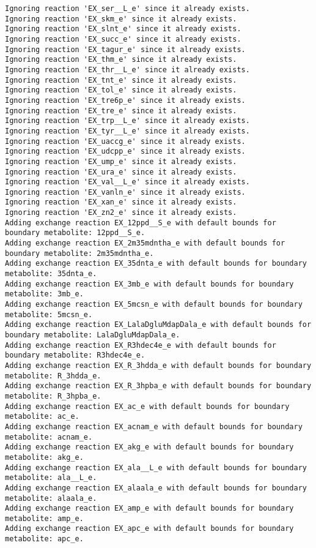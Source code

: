 \documentclass[
  letterpaper,
  DIV=11,
  numbers=noendperiod]{scrartcl}
\begin{document}
\begin{verbatim}
Ignoring reaction 'EX_ser__L_e' since it already exists.
Ignoring reaction 'EX_skm_e' since it already exists.
Ignoring reaction 'EX_slnt_e' since it already exists.
Ignoring reaction 'EX_succ_e' since it already exists.
Ignoring reaction 'EX_tagur_e' since it already exists.
Ignoring reaction 'EX_thm_e' since it already exists.
Ignoring reaction 'EX_thr__L_e' since it already exists.
Ignoring reaction 'EX_tnt_e' since it already exists.
Ignoring reaction 'EX_tol_e' since it already exists.
Ignoring reaction 'EX_tre6p_e' since it already exists.
Ignoring reaction 'EX_tre_e' since it already exists.
Ignoring reaction 'EX_trp__L_e' since it already exists.
Ignoring reaction 'EX_tyr__L_e' since it already exists.
Ignoring reaction 'EX_uaccg_e' since it already exists.
Ignoring reaction 'EX_udcpp_e' since it already exists.
Ignoring reaction 'EX_ump_e' since it already exists.
Ignoring reaction 'EX_ura_e' since it already exists.
Ignoring reaction 'EX_val__L_e' since it already exists.
Ignoring reaction 'EX_vanln_e' since it already exists.
Ignoring reaction 'EX_xan_e' since it already exists.
Ignoring reaction 'EX_zn2_e' since it already exists.
Adding exchange reaction EX_12ppd__S_e with default bounds for boundary metabolite: 12ppd__S_e.
Adding exchange reaction EX_2m35mdntha_e with default bounds for boundary metabolite: 2m35mdntha_e.
Adding exchange reaction EX_35dnta_e with default bounds for boundary metabolite: 35dnta_e.
Adding exchange reaction EX_3mb_e with default bounds for boundary metabolite: 3mb_e.
Adding exchange reaction EX_5mcsn_e with default bounds for boundary metabolite: 5mcsn_e.
Adding exchange reaction EX_LalaDgluMdapDala_e with default bounds for boundary metabolite: LalaDgluMdapDala_e.
Adding exchange reaction EX_R3hdec4e_e with default bounds for boundary metabolite: R3hdec4e_e.
Adding exchange reaction EX_R_3hdda_e with default bounds for boundary metabolite: R_3hdda_e.
Adding exchange reaction EX_R_3hpba_e with default bounds for boundary metabolite: R_3hpba_e.
Adding exchange reaction EX_ac_e with default bounds for boundary metabolite: ac_e.
Adding exchange reaction EX_acnam_e with default bounds for boundary metabolite: acnam_e.
Adding exchange reaction EX_akg_e with default bounds for boundary metabolite: akg_e.
Adding exchange reaction EX_ala__L_e with default bounds for boundary metabolite: ala__L_e.
Adding exchange reaction EX_alaala_e with default bounds for boundary metabolite: alaala_e.
Adding exchange reaction EX_amp_e with default bounds for boundary metabolite: amp_e.
Adding exchange reaction EX_apc_e with default bounds for boundary metabolite: apc_e.

\end{verbatim}
\end{document}
